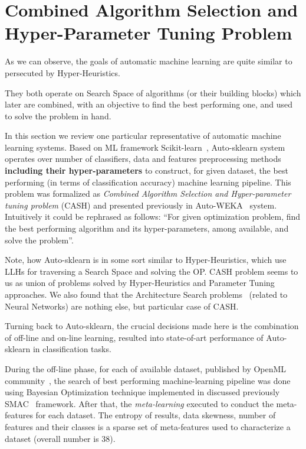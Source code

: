\section{Combined Algorithm Selection and Hyper-Parameter Tuning Problem}\label{bg: section cash}
As we can observe, the goals of automatic machine learning are quite similar to persecuted by Hyper-Heuristics.

They both operate on Search Space of algorithms (or their building blocks) which later are combined, with an objective to find the best performing one, and used to solve the problem in hand. 

In this section we review one particular representative of automatic machine learning systems.
Based on ML framework Scikit-learn~\cite{scikit-learn}, Auto-sklearn system~\cite{feurer2015efficient} operates over number of classifiers, data and features preprocessing methods \textbf{including their hyper-parameters} to construct, for given dataset, the best performing (in terms of classification accuracy) machine learning pipeline.
This problem was formalized as \textit{Combined Algorithm Selection and Hyper-parameter tuning problem} (CASH) and presented previously in Auto-WEKA~\cite{thornton2013auto} system. Intuitively it could be rephrased as follows: ``For given optimization problem, find the best performing algorithm and its hyper-parameters, among available, and solve the problem''. 

Note, how Auto-sklearn is in some sort similar to Hyper-Heuristics, which use LLHs for traversing a Search Space and solving the OP. 
CASH problem seems to us as union of problems solved by Hyper-Heuristics and Parameter Tuning approaches. We also found that the Architecture Search problems~\cite{elsken2018neural} (related to Neural Networks) are nothing else, but particular case of CASH.


Turning back to Auto-sklearn, the crucial decisions made here is the combination of off-line and on-line learning, resulted into state-of-art performance of Auto-sklearn in classification tasks.

During the off-line phase, for each of available dataset, published by OpenML community~\cite{OpenMLPython2019}, the search of best performing machine-learning pipeline was done using Bayesian Optimization technique implemented in discussed previously SMAC~\cite{hutter2011sequential} framework.
After that, the \textit{meta-learning} executed to conduct the meta-features for each dataset. The entropy of results, data skewness, number of features and their classes is a sparse set of meta-features used to characterize a dataset (overall number is 38).

